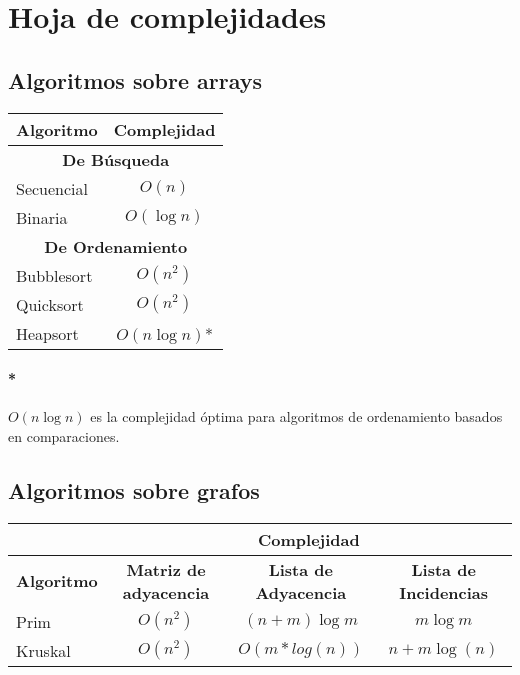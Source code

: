 \appendix
\section{Hoja de complejidades}
\subsection{Algoritmos sobre arrays}
\begin{center}
  \begin{tabular}{|l|c|}
    \hline
    \textbf{Algoritmo} & \textbf{Complejidad}                         \\
    \hline
    \multicolumn{2}{|c|}{\cellcolor{blue!25}\textbf{De Búsqueda}}     \\
    \hline
    Secuencial         & \(O(n)\)                                     \\
    \hline
    Binaria            & \(O(\log{n})\)                               \\
    \hline
    \multicolumn{2}{|c|}{\cellcolor{blue!25}\textbf{De Ordenamiento}} \\
    \hline
    Bubblesort         & \(O(n^2)\)                                   \\
    \hline
    Quicksort          & \(O(n^2)\)                                   \\
    \hline
    Heapsort           & \(O(n\log{n})\)*                             \\
    \hline
  \end{tabular}
\end{center}

\paragraph{*} \(O(n\log{n})\) es la complejidad óptima para algoritmos de ordenamiento basados en comparaciones.

\subsection{Algoritmos sobre grafos}

\begin{center}
  \begin{tabular}{|l|c|c|c|}
    \hline
                       & \multicolumn{3}{c|}{\textbf{Complejidad}}                                                                \\
    \hline
    \textbf{Algoritmo} & \textbf{Matriz de adyacencia}             & \textbf{Lista de Adyacencia} & \textbf{Lista de Incidencias} \\
    \hline
    Prim               & \(O(n^2)\)                                & \((n + m)\log{m}\)           & \(m\log{m}\)                  \\
    \hline
    Kruskal            & \(O(n^2)\)                                & \(O(m*log(n))\)              & \(n + m\log{(n)}\)            \\
    \hline
  \end{tabular}
\end{center}